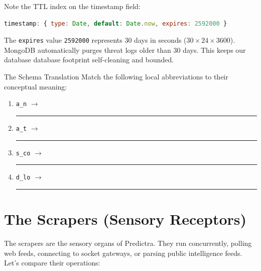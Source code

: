 \documentclass[11pt,a4paper]{report}
\begin{document}
Note the TTL index on the timestamp field:
\begin{lstlisting}[language=JavaScript]
timestamp: { type: Date, default: Date.now, expires: 2592000 }
\end{lstlisting}
The \texttt{expires} value \texttt{2592000} represents 30 days in seconds ($30 \times 24 \times 3600$). MongoDB automatically purges threat logs older than 30 days. This keeps our database database footprint self-cleaning and bounded.

\begin{activerecall}{The Schema Translation}
  Match the following local abbreviations to their conceptual meaning:
  \begin{enumerate}
    \item \texttt{a\_n} $\rightarrow$ \rule{3cm}{0.15mm}
    \item \texttt{a\_t} $\rightarrow$ \rule{3cm}{0.15mm}
    \item \texttt{s\_co} $\rightarrow$ \rule{3cm}{0.15mm}
    \item \texttt{d\_lo} $\rightarrow$ \rule{3cm}{0.15mm}
  \end{enumerate}
\end{activerecall}

\newpage

\chapter{The Scrapers (Sensory Receptors)}

The scrapers are the sensory organs of Predictra. They run concurrently, polling web feeds, connecting to socket gateways, or parsing public intelligence feeds. Let's compare their operations:
\end{document}
